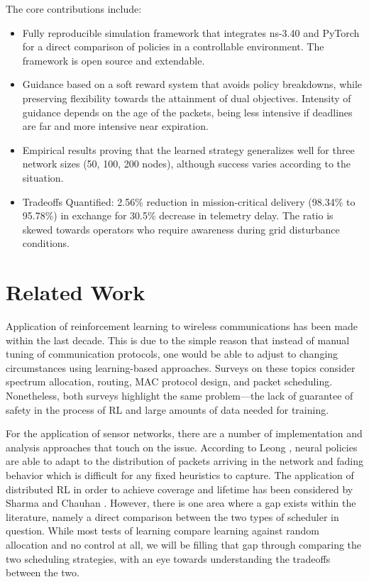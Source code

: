 \documentclass[runningheads]{llncs}
\begin{document}
The core contributions include:
\begin{itemize}
\item Fully reproducible simulation framework that integrates ns-3.40 and PyTorch for a direct comparison of policies in a controllable environment. The framework is open source and extendable.
\item Guidance based on a soft reward system that avoids policy breakdowns, while preserving flexibility towards the attainment of dual objectives. Intensity of guidance depends on the age of the packets, being less intensive if deadlines are far and more intensive near expiration.
\item Empirical results proving that the learned strategy generalizes well for three network sizes (50, 100, 200 nodes), although success varies according to the situation.
\item Tradeoffs Quantified: 2.56\% reduction in mission-critical delivery (98.34\% to 95.78\%) in exchange for 30.5\% decrease in telemetry delay. The ratio is skewed towards operators who require awareness during grid disturbance conditions.
\end{itemize}

\section{Related Work}
Application of reinforcement learning to wireless communications has been made within the last decade. This is due to the simple reason that instead of manual tuning of communication protocols, one would be able to adjust to changing circumstances using learning-based approaches. Surveys \cite{frikha2021,luong2019} on these topics consider spectrum allocation, routing, MAC protocol design, and packet scheduling. Nonetheless, both surveys highlight the same problem---the lack of guarantee of safety in the process of RL and large amounts of data needed for training.

For the application of sensor networks, there are a number of implementation and analysis approaches that touch on the issue. According to Leong \cite{leong2020}, neural policies are able to adapt to the distribution of packets arriving in the network and fading behavior which is difficult for any fixed heuristics to capture. The application of distributed RL in order to achieve coverage and lifetime has been considered by Sharma and Chauhan \cite{sharma2020}. However, there is one area where a gap exists within the literature, namely a direct comparison between the two types of scheduler in question. While most tests of learning compare learning against random allocation and no control at all, we will be filling that gap through comparing the two scheduling strategies, with an eye towards understanding the tradeoffs between the two.
\end{document}
